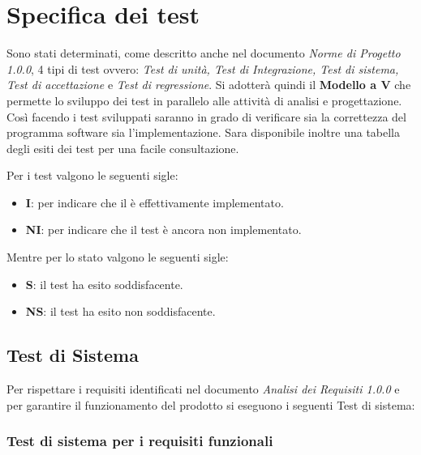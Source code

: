 \section{Specifica dei test}

Sono stati determinati, come descritto anche nel documento \textit{Norme di Progetto 1.0.0}, 4 tipi di test ovvero: \textit{Test di unità, Test di Integrazione, Test di sistema, Test di accettazione} e \textit{Test di regressione}. Si adotterà quindi il \textbf{Modello a V}\glo{} che permette lo sviluppo dei test in parallelo alle attività di analisi e progettazione. Così facendo i test sviluppati saranno in grado di verificare sia la correttezza del programma software sia l'implementazione. Sara disponibile inoltre una tabella degli esiti dei test per una facile consultazione.

Per i test valgono le seguenti sigle:

    \begin{itemize}
        \item \textbf{I}: per indicare che il è effettivamente implementato.
        \item \textbf{NI}: per indicare che il test è ancora non implementato.
    \end{itemize}
    
Mentre per lo stato valgono le seguenti sigle:

    \begin{itemize}
        \item \textbf{S}: il test ha esito soddisfacente.
        \item \textbf{NS}: il test ha esito non soddisfacente.
    \end{itemize}
    

 
\subsection{Test di Sistema}

    Per rispettare i requisiti identificati nel documento \textit{Analisi dei Requisiti 1.0.0} e per garantire il funzionamento del prodotto si eseguono i seguenti Test di sistema:\\
    
\subsubsection{Test di sistema per i requisiti funzionali}
    \hphantom{}

